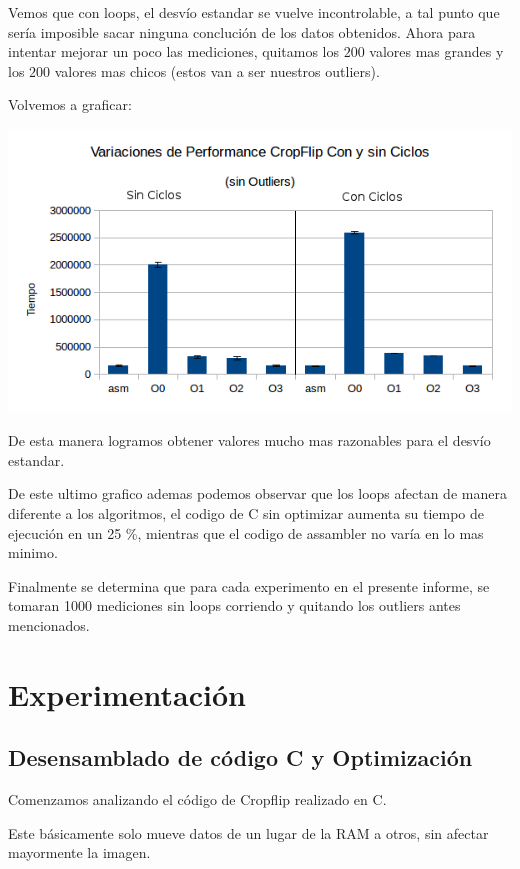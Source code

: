 \documentclass[a4paper]{article}
\begin{document}
Vemos que con loops, el desvío estandar se vuelve incontrolable, a tal punto que sería imposible sacar ninguna conclución de los datos obtenidos. Ahora para intentar mejorar un poco las mediciones, quitamos los $200$ valores mas grandes y los $200$ valores mas chicos (estos van a ser nuestros outliers).

Volvemos a graficar:

  \includegraphics[scale=0.66]{Graficos1.4/1.3/perSinOut.png}

De esta manera logramos obtener valores mucho mas razonables para el desvío estandar.

De este ultimo grafico ademas podemos observar que los loops afectan de manera diferente a los algoritmos, el codigo de C sin optimizar aumenta su tiempo de ejecución en un 25 \%, mientras que el codigo de assambler no varía en lo mas minimo.

Finalmente se determina que para cada experimento en el presente informe, se tomaran 1000 mediciones sin loops corriendo y quitando los outliers antes mencionados.

\newpage

\section{Experimentación}

\subsection{Desensamblado de código C y Optimización}

Comenzamos analizando el código de Cropflip realizado en C.

Este básicamente solo mueve datos de un lugar de la RAM a otros, sin afectar mayormente la imagen.
\end{document}

